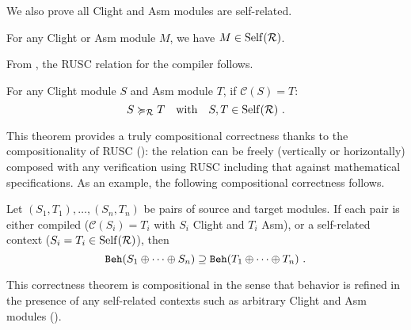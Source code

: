 We also prove all \textrm{Clight} and \textrm{Asm} modules are self-related.
\begin{lemma}\label{thm:results-relatedness} For any \textrm{Clight} or \textrm{Asm}
  module $M$, we have $M \in \mathrm{Self}(\mathcal{R})$.
\end{lemma}
\noindent
{}

From , the RUSC relation for the compiler follows.
\begin{theorem} \label{thm:results-modular}
  For any \textrm{Clight} module $S$ and \textrm{Asm} module $T$, if $\mathcal{C}(S) = T$:
  \[
    {S} \succcurlyeq_{\mathcal{R}} {T} \quad\text{with}\quad S,T \in \mathrm{Self}(\mathcal{R})~.
  \]
\end{theorem}

\noindent
This theorem provides a truly compositional correctness
thanks to the compositionality of RUSC ():
the relation can be freely (\ie vertically or horizontally) composed with any verification using RUSC
including that against mathematical specifications.
As an example, the following compositional correctness follows.
\begin{corollary} \label{thm:results-compiler}
  Let $(S_1,T_1), \ldots, (S_n,T_n)$ be pairs of source and target modules.
  If each pair is either compiled (\ie $\mathcal{C}(S_i) = T_i$ with $S_i$ \textrm{Clight} and $T_i$ \textrm{Asm}), or a self-related context (\ie $S_i = T_i \in \mathrm{Self}(\mathcal{R})$), then
  \[
    \mathtt{Beh}({S_1 \oplus \cdots \oplus S_n}) \supseteq \mathtt{Beh}({T_1 \oplus \cdots \oplus T_n})~.
  \]
\end{corollary}
%
\noindent This correctness theorem is compositional in the sense that behavior is refined in the
presence of any self-related contexts such as arbitrary \textrm{Clight} and \textrm{Asm} modules
().





